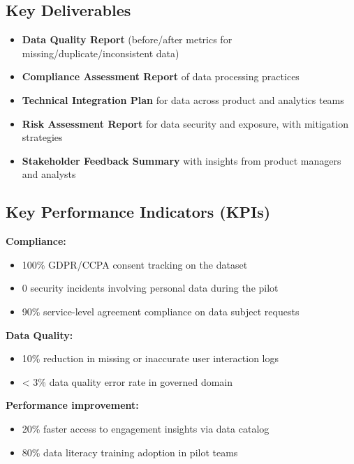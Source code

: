 \documentclass[11pt,a4paper,computermodern]{article}
\begin{document}
\subsection*{Key Deliverables}

\begin{itemize}[itemsep=5pt, parsep=0pt]
	\item \textbf{Data Quality Report} (before/after metrics for missing/duplicate/inconsistent data)
	\item \textbf{Compliance Assessment Report} of data processing practices
	\item \textbf{Technical Integration Plan} for data across product and analytics teams
	\item \textbf{Risk Assessment Report} for data security and exposure, with mitigation strategies
	\item \textbf{Stakeholder Feedback Summary} with insights from product managers and analysts
\end{itemize}


\subsection*{Key Performance Indicators (KPIs)}

\noindent\textbf{Compliance:}
\begin{itemize}[itemsep=5pt, parsep=0pt]
	\item 100\% GDPR/CCPA consent tracking on the dataset
	\item 0 security incidents involving personal data during the pilot
	\item 90\% service-level agreement compliance on data subject requests
\end{itemize}

\noindent\textbf{Data Quality:}
\begin{itemize}[itemsep=5pt, parsep=0pt]
	\item 10\% reduction in missing or inaccurate user interaction logs
	\item < 3\% data quality error rate in governed domain
\end{itemize}

\noindent\textbf{Performance improvement:}
\begin{itemize}[itemsep=5pt, parsep=0pt]
	\item 20\% faster access to engagement insights via data catalog
	\item 80\% data literacy training adoption in pilot teams
\end{itemize}
\end{document}
